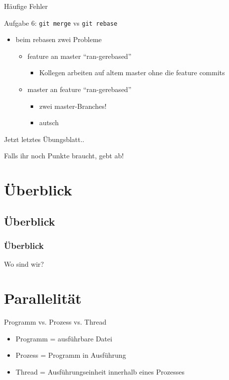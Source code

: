 \documentclass[18pt]{beamer}
\begin{document}
	\begin{frame}{Häufige Fehler}
		\begin{block}{Aufgabe 6: \texttt{git merge} vs \texttt{git rebase}}
			\begin{itemize}
				\item beim rebasen zwei Probleme
				\begin{itemize}
					\item feature an master \enquote{ran-gerebased}
					\begin{itemize}
						\item Kollegen arbeiten auf altem master ohne die feature commits
					\end{itemize}
					\pause
					\item master an feature \enquote{ran-gerebased}
					\begin{itemize}
						\item zwei master-Branches! 
						\item autsch
					\end{itemize}
				\end{itemize}
			\end{itemize}
		\end{block}
	\end{frame}

	\begin{frame}{Jetzt letztes Übungsblatt..}
		\begin{huge}
			Falls ihr noch Punkte braucht, gebt ab!
		\end{huge}
\end{frame}

\section{Überblick}
	\subsection{Überblick}
	\begin{frame}
		\frametitle{Überblick}
		\centering \huge Wo sind wir?
	\end{frame}
	
	
\section{Parallelität}
	
	\begin{frame}{Programm vs. Prozess vs. Thread}
		\begin{itemize}
			\item Programm = ausführbare Datei
			\item Prozess = Programm in Ausführung
			\item Thread = Ausführungseinheit innerhalb eines Prozesses
		\end{itemize}
	\end{frame}
	
\end{document}
